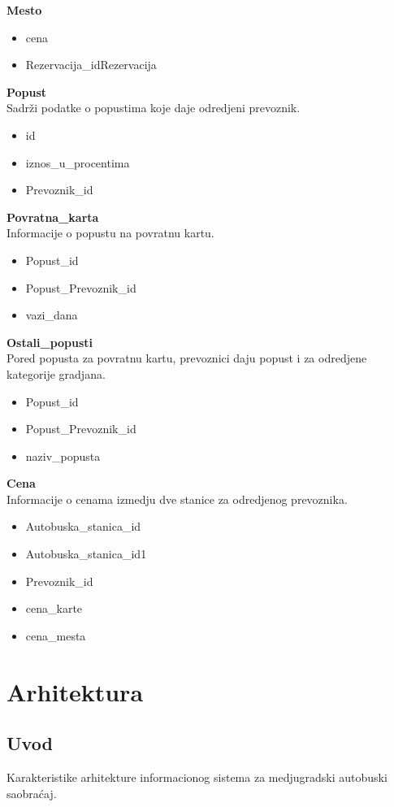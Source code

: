 \textbf{Mesto}
\begin{itemize}
	\item cena
	\item Rezervacija\_idRezervacija
\end{itemize}
\textbf{Popust} \\
Sadr\v zi podatke o popustima koje daje odredjeni prevoznik.
\begin{itemize}
	\item id
	\item iznos\_u\_procentima
	\item Prevoznik\_id
\end{itemize}
\textbf{Povratna\_karta}\\
Informacije o popustu na povratnu kartu.
\begin{itemize}
	\item Popust\_id
	\item Popust\_Prevoznik\_id
	\item vazi\_dana
\end{itemize}
\textbf{Ostali\_popusti} \\
Pored popusta za povratnu kartu, prevoznici daju popust i za odredjene kategorije gradjana.
\begin{itemize}
	\item Popust\_id
	\item Popust\_Prevoznik\_id
	\item naziv\_popusta
\end{itemize}
\textbf{Cena}\\
Informacije o cenama izmedju dve stanice za odredjenog prevoznika.
\begin{itemize}
	\item Autobuska\_stanica\_id
	\item Autobuska\_stanica\_id1
	\item Prevoznik\_id
	\item cena\_karte
	\item cena\_mesta
\end{itemize}
\newpage
\section{Arhitektura}
\subsection{Uvod}
Karakteristike arhitekture informacionog sistema za medjugradski autobuski saobra\' caj.

